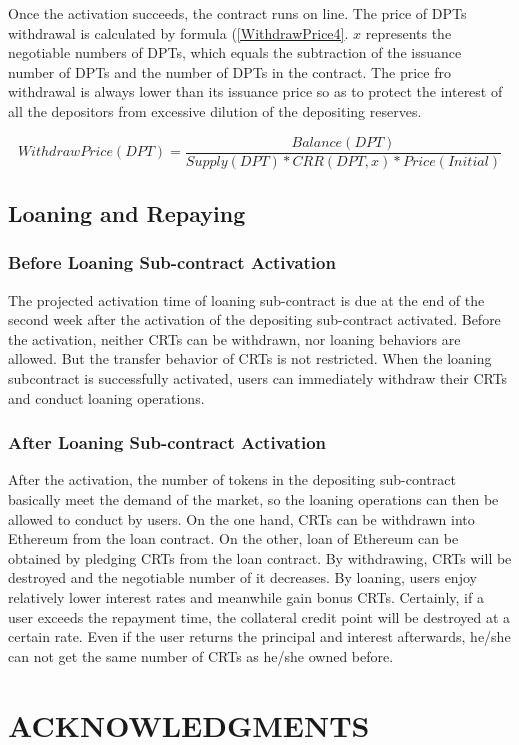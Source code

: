 \documentclass[a4paper, 10pt, conference]{ieeeconf} %
\begin{document}
Once the activation succeeds, the contract runs on line. The price of DPTs withdrawal is calculated by formula (\ref{WithdrawPrice4}. $x$ represents the negotiable numbers of DPTs, which equals the subtraction of the issuance number of DPTs and the number of DPTs in the contract. The price fro withdrawal is always lower than its issuance price so as to protect the interest of all the depositors from excessive dilution of the depositing reserves.

\begin{equation}\label{WithdrawPrice4}
{WithdrawPrice(DPT) = \frac{Balance(DPT)}{Supply(DPT) * CRR(DPT, x) * Price(Initial)}}
\end{equation}

\subsection{Loaning and Repaying}
\subsubsection{Before Loaning Sub-contract Activation}
The projected activation time of loaning sub-contract is due at the end of the second week after the activation of the depositing sub-contract activated. Before the activation, neither CRTs can be withdrawn, nor loaning behaviors are allowed. But the transfer behavior of CRTs is not restricted. When the loaning subcontract is successfully activated, users can immediately withdraw their CRTs and conduct loaning operations.



\subsubsection{After Loaning Sub-contract Activation}
After the activation, the number of tokens in the depositing sub-contract basically meet the demand of the market, so the loaning operations can then be allowed to conduct by users. On the one hand, CRTs can be withdrawn into Ethereum from the loan contract. On the other, loan of Ethereum can be obtained by pledging CRTs from the loan contract. By withdrawing, CRTs will be destroyed and the negotiable number of it decreases. By loaning, users enjoy relatively lower interest rates and meanwhile gain bonus CRTs. Certainly, if a user exceeds the repayment time, the collateral credit point will be destroyed at a certain rate. Even if the user returns the principal and interest afterwards, he/she can not get the same number of CRTs as he/she owned before.



\section*{ACKNOWLEDGMENTS}

%
%

%
\printbibliography
\end{document}

